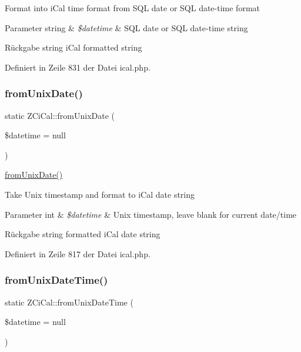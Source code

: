 Format into i\+Cal time format from S\+QL date or S\+QL date-\/time format


\begin{DoxyParams}[1]{Parameter}
string & {\em \$datetime} & S\+QL date or S\+QL date-\/time string\\
\hline
\end{DoxyParams}
\begin{DoxyReturn}{Rückgabe}
string i\+Cal formatted string 
\end{DoxyReturn}


Definiert in Zeile 831 der Datei ical.\+php.

\mbox{\label{class_z_ci_cal_aeec969693d373f541b999e32d8b8f8c1}} 
\subsubsection{\texorpdfstring{from\+Unix\+Date()}{fromUnixDate()}}
{\footnotesize\ttfamily static Z\+Ci\+Cal\+::from\+Unix\+Date (\begin{DoxyParamCaption}\item[{}]{\$datetime = {\ttfamily null} }\end{DoxyParamCaption})\hspace{0.3cm}{\ttfamily [static]}}

\mbox{\hyperlink{class_z_ci_cal_aeec969693d373f541b999e32d8b8f8c1}{from\+Unix\+Date()}}

Take Unix timestamp and format to i\+Cal date string


\begin{DoxyParams}[1]{Parameter}
int & {\em \$datetime} & Unix timestamp, leave blank for current date/time\\
\hline
\end{DoxyParams}
\begin{DoxyReturn}{Rückgabe}
string formatted i\+Cal date string 
\end{DoxyReturn}


Definiert in Zeile 817 der Datei ical.\+php.

\mbox{\label{class_z_ci_cal_a08385d87a6168835952fdc8e6118ee42}} 
\subsubsection{\texorpdfstring{from\+Unix\+Date\+Time()}{fromUnixDateTime()}}
{\footnotesize\ttfamily static Z\+Ci\+Cal\+::from\+Unix\+Date\+Time (\begin{DoxyParamCaption}\item[{}]{\$datetime = {\ttfamily null} }\end{DoxyParamCaption})\hspace{0.3cm}{\ttfamily [static]}}

